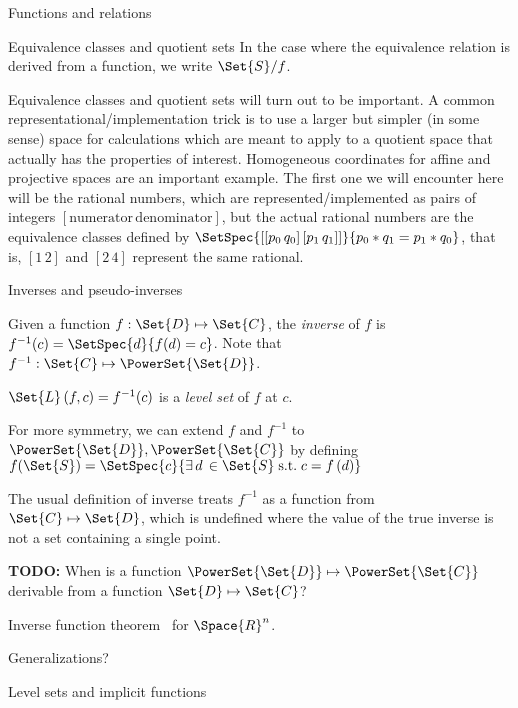 \begin{plSection}{Functions and relations}
\begin{plSection}{Equivalence classes and quotient sets}
In the case where the equivalence relation is derived from a
function, we write $\Set{S} / f$.

Equivalence classes and quotient sets will turn out to be
important. A common representational/implementation trick is to
use a larger but simpler (in some sense) space for calculations
which are meant to apply to a quotient space that actually has the
properties of interest. Homogeneous coordinates for affine and
projective spaces  are an important example.
The first one we will encounter here will be the rational numbers,
which are represented/implemented as pairs of integers
$[\text{numerator} \, \text{denominator}]$, but the actual
rational numbers are the equivalence classes defined by 
$\SetSpec{ [[p_0 \, q_0] \, [p_1 \, q_1]]}{p_0*q_1 = p_1*q_0 }$,
that is, $[1 \, 2]$ and $[2 \, 4]$ represent the same rational.
\end{plSection}%
\begin{plSection}{Inverses and pseudo-inverses}
\label{sec:Inverses-and-pseudo-inverses}

Given a function $f : \Set{D} \mapsto \Set{C}$,
the \textit{inverse} of $f$ is 
$f^{-1}(c) = \SetSpec{d}{f(d) = c}$.
Note that $f^{-1} : \Set{C}  \mapsto \PowerSet{\Set{D}}$.

$\Set{L}\left( f , c \right) = f^{-1}(c)$ is a \textit{level set} of
$f$ at $c$.

For more symmetry, we can extend $f$ and $f^{-1}$ to 
$\PowerSet{\Set{D}}  , \PowerSet{\Set{C}}$
by defining
$f(\Set{S}) = 
\SetSpec{c}{\exists \, d \, \in \Set{S} \; \text{s.t.} \; c = f \left( d \right)}$

The usual definition of inverse treats $f^{-1}$
as a function from $\Set{C} \mapsto \Set{D}$,
which is undefined where the value of the true
inverse is not a set containing a single point.

\textbf{TODO:} When is a function 
$\PowerSet{\Set{D}}  \mapsto \PowerSet{\Set{C}}$
derivable from a function $\Set{D} \mapsto \Set{C}$?

Inverse function theorem~\cite[Theorem~2-1]{Spivak:1965:CalculusOnManifolds}
for $\Space{R}^n$. 

Generalizations?~\cite{wiki:InverseFunctionTheorem}

\end{plSection}%
\begin{plSection}{Level sets and implicit functions}
\label{sec:Implicit-functions}


\end{plSection}
\end{plSection}
